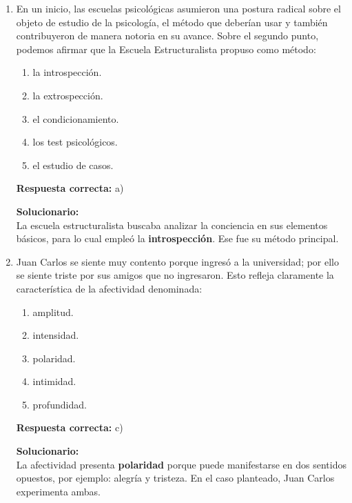 \begin{enumerate}
	
	\item En un inicio, las escuelas psicológicas asumieron una postura radical sobre el objeto de estudio de la psicología, el método que deberían usar y también contribuyeron de manera notoria en su avance. Sobre el segundo punto, podemos afirmar que la Escuela Estructuralista propuso como método:
	\begin{enumerate}[label=\alph*)]
		\item la introspección.
		\item la extrospección.
		\item el condicionamiento.
		\item los test psicológicos.
		\item el estudio de casos.
	\end{enumerate}
	\textbf{Respuesta correcta:} a)
	
	\vspace{2mm}
	\textbf{Solucionario:}\\
	La escuela estructuralista buscaba analizar la conciencia en sus elementos básicos, para lo cual empleó la \textbf{introspección}.  
	Ese fue su método principal.
	
	\vspace{6mm}
	
	\item Juan Carlos se siente muy contento porque ingresó a la universidad; por ello se siente triste por sus amigos que no ingresaron. Esto refleja claramente la característica de la afectividad denominada:
	\begin{enumerate}[label=\alph*)]
		\item amplitud.
		\item intensidad.
		\item polaridad.
		\item intimidad.
		\item profundidad.
	\end{enumerate}
	\textbf{Respuesta correcta:} c)
	
	\vspace{2mm}
	\textbf{Solucionario:}\\
	La afectividad presenta \textbf{polaridad} porque puede manifestarse en dos sentidos opuestos, por ejemplo: alegría y tristeza.  
	En el caso planteado, Juan Carlos experimenta ambas.
	
	\vspace{6mm}
	

\end{enumerate}
